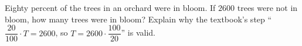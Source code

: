 Eighty percent of the trees in an orchard were in bloom. If $2600$ trees were not in bloom, how many trees were in bloom? Explain why the textbook's step ``$\dfrac{20}{100}\cdot T=2600$, so $T=2600\cdot\dfrac{100}{20}$'' is valid.
